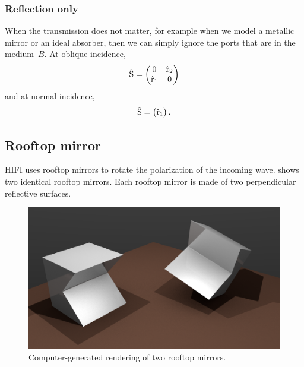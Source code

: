 \subsubsection{Reflection only}
When the transmission does not matter, for example when we model a metallic mirror or an ideal absorber, then we can simply ignore the ports that are in the medium~$B$.
At oblique incidence,
\begin{equation}
    \hat{\mathrm{S}}
    =
    \begin{pmatrix}
        0            & \hat{\mathrm{r}}_2 \\
        \hat{\mathrm{r}}_1 & 0 
    \end{pmatrix}
\end{equation}
and at normal incidence,
\begin{equation}
    \hat{\mathrm{S}}
    =
    \begin{pmatrix}
        \hat{\mathrm{r}}_1
    \end{pmatrix}
    \text{.}
\end{equation}



\subsection{Rooftop mirror}
HIFI uses rooftop mirrors to rotate the polarization of the incoming wave.
 shows two identical rooftop mirrors.
Each rooftop mirror is made of two perpendicular reflective surfaces.
\begin{figure}
    \centering
    \includegraphics[width=\textwidth]{rooftop_render}
    \caption{Computer-generated rendering of two rooftop mirrors.}
    \label{fig:rooftop_render}
\end{figure}

